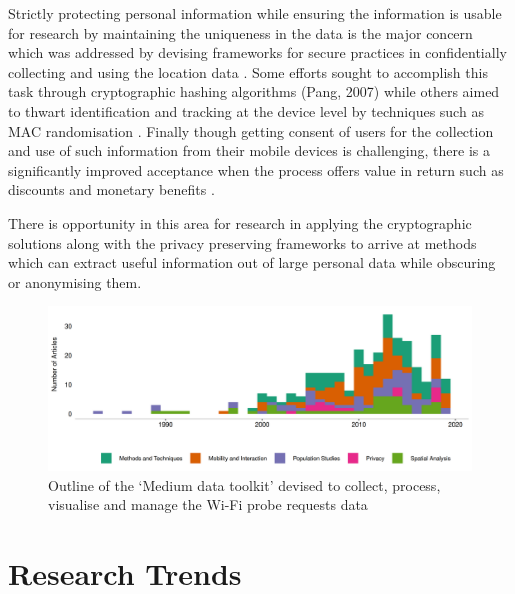 Strictly protecting personal information while ensuring the information is usable for research by maintaining the uniqueness in the data is the major concern which was addressed by devising frameworks for secure practices in confidentially collecting and using the location data \citep{duckham2006, tang2006, lane2014}.
Some efforts sought to accomplish this task through cryptographic hashing algorithms (Pang, 2007) while others aimed to thwart identification and tracking at the device level by techniques such as MAC randomisation \citep{gruteser2005, green2008}.
Finally though getting consent of users for the collection and use of such information from their mobile devices is challenging, there is a significantly improved acceptance when the process offers value in return such as discounts and monetary benefits \citep{kobsa2014user}.

There is opportunity in this area for research in applying the cryptographic solutions along with the privacy preserving frameworks to arrive at methods which can extract useful information out of large personal data while obscuring or anonymising them.


\begin{figure}
  \includegraphics{images/literature-themes-timeline.png}
  \caption{Outline of the `Medium data toolkit' devised to collect, process, visualise and manage the Wi-Fi probe requests data}
  \label{figure:literature:themes:timeline}
\end{figure}

\section{Research Trends}


